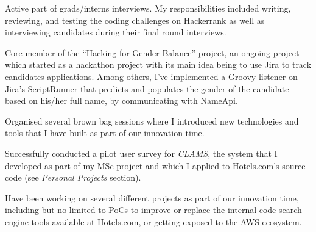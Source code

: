 \begin{cventries}
{       \begin{cvitems}
        \item {Active part of grads/interns interviews. My responsibilities included writing, reviewing, and testing the coding challenges on Hackerrank as well as interviewing candidates during their final round interviews.}
         \item {Core member of the ``Hacking for Gender Balance'' project, an ongoing project which started as a hackathon project with its main idea being to use Jira to track candidates applications. Among others, I've implemented a Groovy listener on Jira's ScriptRunner that predicts and populates the gender of the candidate based on his/her full name, by communicating with NameApi.}
        \item{Organised several brown bag sessions where I introduced new technologies and tools that I have built as part of our innovation time.}
        \item{Successfully conducted a pilot user survey for \textit{CLAMS}, the system that I developed as part of my MSc project and which I applied to Hotels.com's source code (see \textit{Personal Projects} section).}
         \item{Have been working on several different projects as part of our innovation time, including but no limited to PoCs to improve or replace the internal code search engine tools available at Hotels.com, or getting exposed to the AWS ecosystem.}
      \end{cvitems}
    }
\end{cventries}